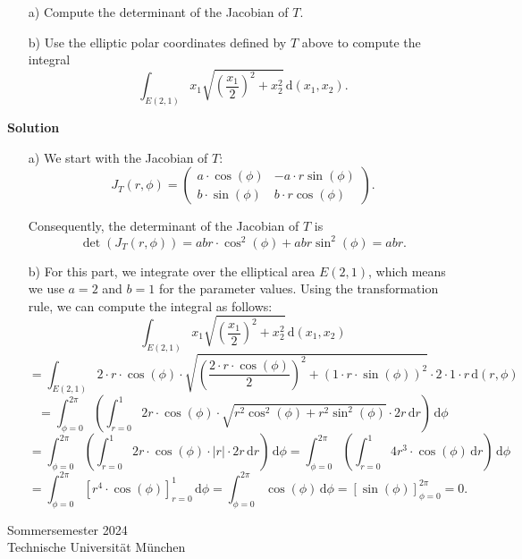 \documentclass{article}
\begin{document}
\begin{enumerate}
\begin{enumerate}
    \item[a)] Compute the determinant of the Jacobian of \( T \).
    \item[b)] Use the elliptic polar coordinates defined by \( T \) above to compute the integral
    \[
    \int_{E(2,1)} x_1 \sqrt{\left( \frac{x_1}{2} \right)^2 + x_2^2} \, \mathrm{d}(x_1, x_2).
    \]
\end{enumerate}

\textbf{Solution}

\begin{enumerate}
    \item[a)] We start with the Jacobian of \( T \):
    \[
    J_{T}(r, \phi) = \begin{pmatrix}
    a \cdot \cos(\phi) & -a \cdot r \sin(\phi) \\
    b \cdot \sin(\phi) & b \cdot r \cos(\phi)
    \end{pmatrix}.
    \]
    
    Consequently, the determinant of the Jacobian of \( T \) is
    \[
    \det(J_{T}(r, \phi)) = a b r \cdot \cos^{2}(\phi) + a b r \sin^{2}(\phi) = a b r.
    \]

    \item[b)] For this part, we integrate over the elliptical area \( E(2,1) \), which means we use \( a = 2 \) and \( b = 1 \) for the parameter values. Using the transformation rule, we can compute the integral as follows:
    \[
    \int_{E(2,1)} x_{1} \sqrt{\left( \frac{x_{1}}{2} \right)^{2} + x_{2}^{2}} \, \mathrm{d}(x_{1}, x_{2})
    \]
    \[
    = \int_{E(2,1)} 2 \cdot r \cdot \cos(\phi) \cdot \sqrt{\left( \frac{2 \cdot r \cdot \cos(\phi)}{2} \right)^{2} + (1 \cdot r \cdot \sin(\phi))^{2}} \cdot 2 \cdot 1 \cdot r \, \mathrm{d}(r, \phi)
    \]
    \[
    = \int_{\phi=0}^{2\pi} \left( \int_{r=0}^{1} 2 r \cdot \cos(\phi) \cdot \sqrt{r^{2} \cos^{2}(\phi) + r^{2} \sin^{2}(\phi)} \cdot 2 r \, \mathrm{d}r \right) \, \mathrm{d}\phi
    \]
    \[
    = \int_{\phi=0}^{2\pi} \left( \int_{r=0}^{1} 2 r \cdot \cos(\phi) \cdot |r| \cdot 2 r \, \mathrm{d}r \right) \, \mathrm{d}\phi = \int_{\phi=0}^{2\pi} \left( \int_{r=0}^{1} 4 r^{3} \cdot \cos(\phi) \, \mathrm{d}r \right) \, \mathrm{d}\phi
    \]
    \[
    = \int_{\phi=0}^{2\pi} \left[ r^{4} \cdot \cos(\phi) \right]_{r=0}^{1} \, \mathrm{d}\phi = \int_{\phi=0}^{2\pi} \cos(\phi) \, \mathrm{d}\phi = \left[ \sin(\phi) \right]_{\phi=0}^{2\pi} = 0.
    \]
\end{enumerate}
\end{enumerate}
\vfill 
Sommersemester 2024 \\
Technische Universit\"at M\"unchen
\end{document}
